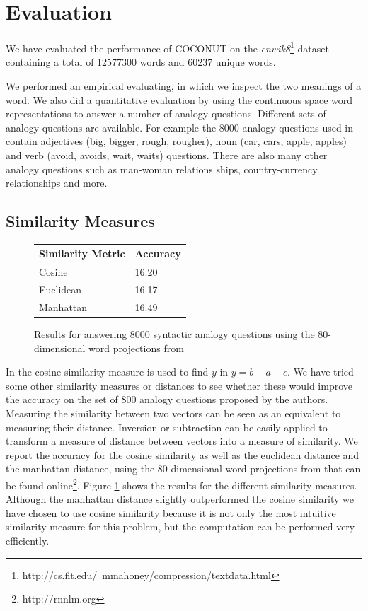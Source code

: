 \documentclass[11pt]{article}
\begin{document}
\section{Evaluation}
We have evaluated the performance of COCONUT on the \textit{enwik8}\footnote{http://cs.fit.edu/~mmahoney/compression/textdata.html} dataset containing a total of 12577300 words and 60237 unique words. 

We performed an empirical evaluating, in which we inspect the two meanings of a word. We also did a quantitative evaluation by using the continuous space word representations to answer a number of analogy questions. Different sets of analogy questions are available. For example the 8000 analogy questions used in \cite{Mikolov:13} contain adjectives (big, bigger, rough, rougher), noun (car, cars, apple, apples) and verb (avoid, avoids, wait, waits) questions. There are also many other analogy questions such as man-woman relations ships, country-currency relationships and more.

\subsection{Similarity Measures}
\begin{figure}
\center
    \begin{tabular}{l|l}
    \textbf{Similarity Metric} & \textbf{Accuracy}  \\ \hline
    Cosine            & 16.20     \\ \hline
    Euclidean         & 16.17     \\ \hline
    Manhattan         & 16.49     \\
    \end{tabular}
    \caption{Results for answering 8000 syntactic analogy questions using the 80-dimensional word projections from \cite{Mikolov:13}}
    \label{sims}

\end{figure}

In \cite{Mikolov:13} the cosine similarity measure is used to find $y$ in $y = b - a + c$. We have tried some other similarity measures or distances to see whether these would improve the accuracy on the set of 800 analogy questions proposed by the authors. Measuring the similarity between two vectors can be seen as an equivalent to measuring their distance. Inversion or subtraction can be easily applied to transform a measure of distance between vectors into a measure of similarity. We report the accuracy for the cosine similarity as well as the euclidean distance and the manhattan distance, using the 80-dimensional word projections from \cite{Mikolov:13} that can be found online\footnote{http://rnnlm.org}. Figure \ref{sims} shows the results for the different similarity measures. Although the manhattan distance slightly outperformed the cosine similarity we have chosen to use cosine similarity because it is not only the most intuitive similarity measure for this problem, but the computation can be performed very efficiently. 
\end{document}
